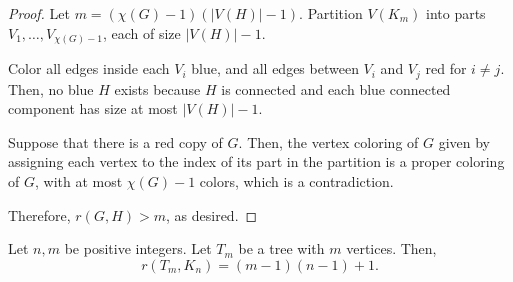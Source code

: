 \begin{proof}
    Let \(m = (\chi(G) - 1)(|V(H)| - 1)\).
    Partition \(V(K_m)\) into parts \(V_1, \dots, V_{\chi(G) - 1}\),
    each of size \(|V(H)| - 1\).

    Color all edges inside each \(V_i\) blue, and all edges between \(V_i\) and \(V_j\) red for \(i \neq j\).
    Then, no blue \(H\) exists because \(H\) is connected and each blue connected component has size at most \(|V(H)| - 1\).

    Suppose that there is a red copy of \(G\).
    Then, the vertex coloring of \(G\) given by assigning each vertex to the index of its part in the partition is a proper coloring of \(G\), with at most \(\chi(G) - 1\) colors, which is a contradiction.

    Therefore, \(r(G, H) > m\), as desired.
\end{proof}

\begin{theorem}[Chvátal] \label{thm:chvatal}
    Let \(n, m\) be positive integers.
    Let \(T_m\) be a tree with \(m\) vertices.
    Then,
    \begin{equation}
        r(T_m, K_n) = (m-1)(n-1) + 1.
    \end{equation}
\end{theorem}

